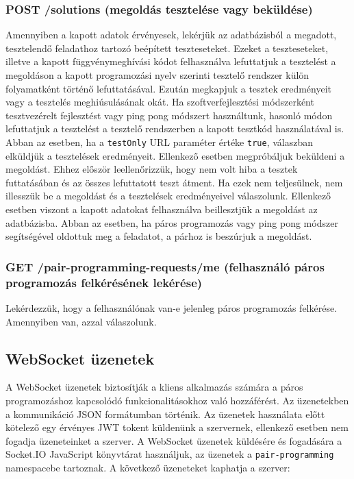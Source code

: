 \documentclass{elteikthesis}
\begin{document}
				\subsubsection{POST /solutions (megoldás tesztelése vagy beküldése)}
					Amennyiben a kapott adatok érvényesek, lekérjük az adatbázisból a megadott, tesztelendő feladathoz tartozó beépített teszteseteket. Ezeket a teszteseteket, illetve a kapott függvénymeghívási kódot felhasználva lefuttatjuk a tesztelést a megoldáson a kapott programozási nyelv szerinti tesztelő rendszer külön folyamatként történő lefuttatásával. Ezután megkapjuk a tesztek eredményeit vagy a tesztelés meghiúsulásának okát. Ha szoftverfejlesztési módszerként tesztvezérelt fejlesztést vagy ping pong módszert használtunk, hasonló módon lefuttatjuk a tesztelést a tesztelő rendszerben a kapott tesztkód használatával is. Abban az esetben, ha a \texttt{testOnly} URL paraméter értéke \texttt{true}, válaszban elküldjük a tesztelések eredményeit. Ellenkező esetben megpróbáljuk beküldeni a megoldást. Ehhez először leellenőrizzük, hogy nem volt hiba a tesztek futtatásában és az összes lefuttatott teszt átment. Ha ezek nem teljesülnek, nem illesszük be a megoldást és a tesztelések eredményeivel válaszolunk. Ellenkező esetben viszont a kapott adatokat felhasználva beillesztjük a megoldást az adatbázisba. Abban az esetben, ha páros programozás vagy ping pong módszer segítségével oldottuk meg a feladatot, a párhoz is beszúrjuk a megoldást.
				
				\subsubsection{GET /pair-programming-requests/me (felhasználó páros programozás felkérésének lekérése)}
					Lekérdezzük, hogy a felhasználónak van-e jelenleg páros programozás felkérése. Amennyiben van, azzal válaszolunk.
			
			\subsection{WebSocket üzenetek}
				A WebSocket üzenetek biztosítják a kliens alkalmazás számára a páros programozáshoz kapcsolódó funkcionalitásokhoz való hozzáférést. Az üzenetekben a kommunikáció JSON formátumban történik. Az üzenetek használata előtt kötelező egy érvényes JWT tokent küldenünk a szervernek, ellenkező esetben nem fogadja üzeneteinket a szerver. A WebSocket üzenetek küldésére és fogadására a Socket.IO JavaScript könyvtárat használjuk, az üzenetek a \texttt{pair-programming} namespacebe tartoznak. A következő üzeneteket kaphatja a szerver:
\end{document}
